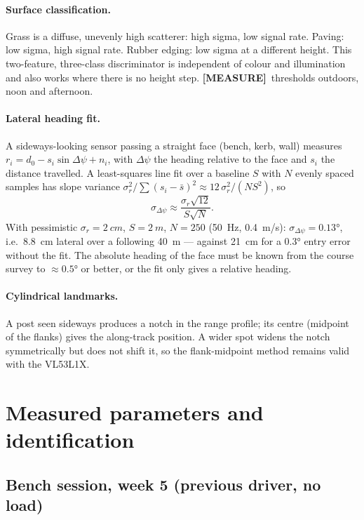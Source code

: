 \documentclass[11pt,a4paper]{article}
\newcommand{\mk}[2]{\textsf{\scriptsize\bfseries\colorbox{#1bg}{\color{#1}[#2]}}}
\newcommand{\MEASURE}{\mk{warn}{MEASURE}}
\begin{document}
\paragraph{Surface classification.} Grass is a diffuse, unevenly high scatterer:
high sigma, low signal rate. Paving: low sigma, high signal rate. Rubber edging:
low sigma at a different height. This two-feature, three-class discriminator is
independent of colour and illumination and also works where there is no height
step. \MEASURE\ thresholds outdoors, noon and afternoon.

\paragraph{Lateral heading fit.} A sideways-looking sensor passing a straight
face (bench, kerb, wall) measures $r_i=d_0-s_i\sin\Delta\psi+n_i$, with
$\Delta\psi$ the heading relative to the face and $s_i$ the distance travelled.
A least-squares line fit over a baseline $S$ with $N$ evenly spaced samples has
slope variance $\sigma_r^2/\sum(s_i-\bar s)^2\approx12\,\sigma_r^2/(NS^2)$, so
\begin{equation}
\sigma_{\Delta\psi}\approx\frac{\sigma_r\sqrt{12}}{S\sqrt N}.\label{eq:headingfit}
\end{equation}
With pessimistic $\sigma_r=\qty{2}{cm}$, $S=\qty{2}{m}$, $N=250$ (\qty{50}{Hz},
\qty{0.4}{m/s}): $\sigma_{\Delta\psi}=\ang{0.13}$, i.e.\ \qty{8.8}{cm} lateral
over a following \qty{40}{m} --- against \qty{21}{cm} for a \ang{0.3} entry
error without the fit. The absolute heading of the face must be known from the
course survey to $\approx\ang{0.5}$ or better, or the fit only gives a relative
heading.

\paragraph{Cylindrical landmarks.} A post seen sideways produces a notch in the
range profile; its centre (midpoint of the flanks) gives the along-track
position. A wider spot widens the notch symmetrically but does not shift it, so
the flank-midpoint method remains valid with the VL53L1X.
\clearpage
\section{Measured parameters and identification}\label{sec:measured}

\subsection{Bench session, week 5 (previous driver, no load)}\label{sec:bench}
\end{document}

